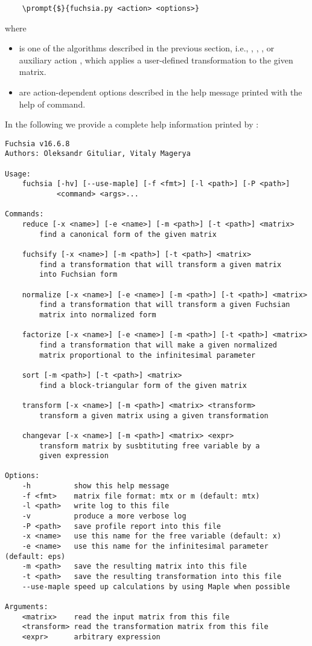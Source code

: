 \documentclass[12pt,a4paper]{article}
\begin{document}
\begin{Verbatim}
    \prompt{$}{fuchsia.py <action> <options>}
\end{Verbatim}

where
\begin{itemize}
  \item {} is one of the algorithms described in the previous section, i.e., , , , or auxiliary action , which applies a user-defined transformation to the given matrix.
  \item {} are action-dependent options described in the help message printed with the help of  command.
\end{itemize}

In the following we provide a complete help information printed by :
\begin{Verbatim}
Fuchsia v16.6.8
Authors: Oleksandr Gituliar, Vitaly Magerya

Usage:
    fuchsia [-hv] [--use-maple] [-f <fmt>] [-l <path>] [-P <path>]
            <command> <args>...

Commands:
    reduce [-x <name>] [-e <name>] [-m <path>] [-t <path>] <matrix>
        find a canonical form of the given matrix

    fuchsify [-x <name>] [-m <path>] [-t <path>] <matrix>
        find a transformation that will transform a given matrix
        into Fuchsian form

    normalize [-x <name>] [-e <name>] [-m <path>] [-t <path>] <matrix>
        find a transformation that will transform a given Fuchsian
        matrix into normalized form

    factorize [-x <name>] [-e <name>] [-m <path>] [-t <path>] <matrix>
        find a transformation that will make a given normalized
        matrix proportional to the infinitesimal parameter

    sort [-m <path>] [-t <path>] <matrix>
        find a block-triangular form of the given matrix

    transform [-x <name>] [-m <path>] <matrix> <transform>
        transform a given matrix using a given transformation

    changevar [-x <name>] [-m <path>] <matrix> <expr>
        transform matrix by susbtituting free variable by a
        given expression

Options:
    -h          show this help message
    -f <fmt>    matrix file format: mtx or m (default: mtx)
    -l <path>   write log to this file
    -v          produce a more verbose log
    -P <path>   save profile report into this file
    -x <name>   use this name for the free variable (default: x)
    -e <name>   use this name for the infinitesimal parameter (default: eps)
    -m <path>   save the resulting matrix into this file
    -t <path>   save the resulting transformation into this file
    --use-maple speed up calculations by using Maple when possible

Arguments:
    <matrix>    read the input matrix from this file
    <transform> read the transformation matrix from this file
    <expr>      arbitrary expression
\end{Verbatim}
\end{document}

